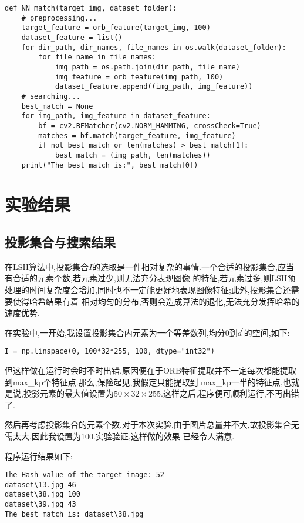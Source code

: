 \documentclass[a4paper]{article}
\begin{document}
\begin{verbatim}
def NN_match(target_img, dataset_folder):
    # preprocessing...
    target_feature = orb_feature(target_img, 100)
    dataset_feature = list()
    for dir_path, dir_names, file_names in os.walk(dataset_folder):
        for file_name in file_names:
            img_path = os.path.join(dir_path, file_name)
            img_feature = orb_feature(img_path, 100)
            dataset_feature.append((img_path, img_feature))
    # searching...
    best_match = None
    for img_path, img_feature in dataset_feature:
        bf = cv2.BFMatcher(cv2.NORM_HAMMING, crossCheck=True)
        matches = bf.match(target_feature, img_feature)
        if not best_match or len(matches) > best_match[1]:
            best_match = (img_path, len(matches))
    print("The best match is:", best_match[0])
\end{verbatim}
\newpage
\section{实验结果}
    \subsection{投影集合与搜索结果}
在LSH算法中,投影集合$I$的选取是一件相对复杂的事情.一个合适的投影集合,应当有合适的元素个数,若元素过少,则无法充分表现图像
的特征,若元素过多,则LSH预处理的时间复杂度会增加,同时也不一定能更好地表现图像特征;此外,投影集合还需要使得哈希结果有着
相对均匀的分布,否则会造成算法的退化,无法充分发挥哈希的速度优势.

在实验中,一开始,我设置投影集合内元素为一个等差数列,均分0到$d^{'}$的空间,如下:
\begin{verbatim}
I = np.linspace(0, 100*32*255, 100, dtype="int32")
\end{verbatim}

但这样做在运行时会时不时出错,原因便在于ORB特征提取并不一定每次都能提取到max\_kp个特征点.那么,保险起见,我假定只能提取到
max\_kp一半的特征点,也就是说,投影元素的最大值设置为$50\times32\times255$.这样之后,程序便可顺利运行,不再出错了.

然后再考虑投影集合的元素个数.对于本次实验,由于图片总量并不大,故投影集合无需太大,因此我设置为100.实验验证,这样做的效果
已经令人满意.

程序运行结果如下:
\begin{verbatim}
The Hash value of the target image: 52
dataset\13.jpg 46
dataset\38.jpg 100
dataset\39.jpg 43
The best match is: dataset\38.jpg
\end{verbatim}
\end{document}

